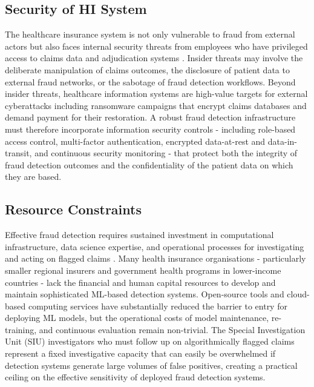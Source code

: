 \subsection{Security of HI System}

The healthcare insurance system is not only vulnerable to fraud from external actors but also faces internal security threats from employees who have privileged access to claims data and adjudication systems \cite{elemam2013}. Insider threats may involve the deliberate manipulation of claims outcomes, the disclosure of patient data to external fraud networks, or the sabotage of fraud detection workflows. Beyond insider threats, healthcare information systems are high-value targets for external cyberattacks including ransomware campaigns that encrypt claims databases and demand payment for their restoration. A robust fraud detection infrastructure must therefore incorporate information security controls - including role-based access control, multi-factor authentication, encrypted data-at-rest and data-in-transit, and continuous security monitoring - that protect both the integrity of fraud detection outcomes and the confidentiality of the patient data on which they are based.

\subsection{Resource Constraints}

Effective fraud detection requires sustained investment in computational infrastructure, data science expertise, and operational processes for investigating and acting on flagged claims \cite{yoo2015}. Many health insurance organisations - particularly smaller regional insurers and government health programs in lower-income countries - lack the financial and human capital resources to develop and maintain sophisticated ML-based detection systems. Open-source tools and cloud-based computing services have substantially reduced the barrier to entry for deploying ML models, but the operational costs of model maintenance, re-training, and continuous evaluation remain non-trivial. The Special Investigation Unit (SIU) investigators who must follow up on algorithmically flagged claims represent a fixed investigative capacity that can easily be overwhelmed if detection systems generate large volumes of false positives, creating a practical ceiling on the effective sensitivity of deployed fraud detection systems.

